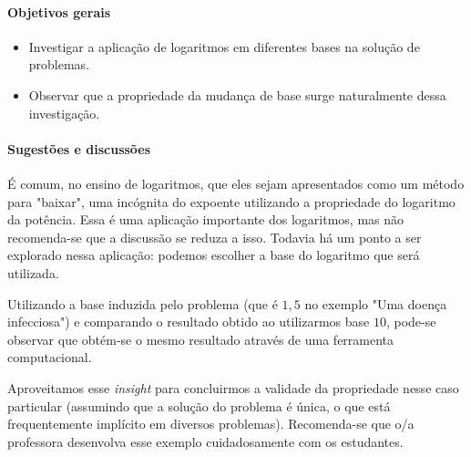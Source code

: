 \cleardoublepage

\def\currentcolor{session1}
\begin{texto}
{
\paragraph{Objetivos gerais}
\begin{itemize}
\item Investigar a aplicação de logaritmos em diferentes bases na solução de problemas.
\item Observar que a propriedade da mudança de base surge naturalmente dessa investigação.
\end{itemize}
\paragraph{Sugestões e discussões}
É comum, no ensino de logaritmos, que eles sejam apresentados como um método para "baixar", uma incógnita do expoente utilizando a propriedade do logaritmo da potência. Essa é uma aplicação importante dos logaritmos, mas não recomenda-se que a discussão se reduza a isso. Todavia há um ponto a ser explorado nessa aplicação: podemos escolher a base do logaritmo que será utilizada.

Utilizando a base induzida pelo problema (que é $1{,}5$ no exemplo "Uma doença infecciosa") e comparando o resultado obtido ao utilizarmos base $10$, pode-se observar que obtém-se o mesmo resultado através de uma ferramenta computacional.

Aproveitamos esse \textit{insight} para concluirmos a validade da propriedade nesse caso particular (assumindo que a solução do problema é única, o que está frequentemente implícito em diversos problemas). Recomenda-se que o/a professora desenvolva esse exemplo cuidadosamente com os estudantes.
}
\end{texto}

